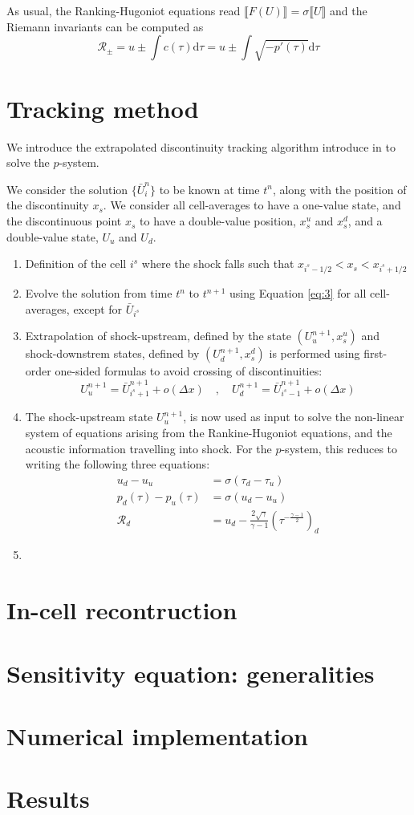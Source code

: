 \documentclass[10pt]{article}
\begin{document}
As usual, the Ranking-Hugoniot equations read $\llbracket F(U) \rrbracket = \sigma \llbracket U \rrbracket$
and the Riemann invariants can be computed as 
$$ \mathcal{R}_\pm = u \pm \int c(\tau) \text{d}\tau = u \pm \int \sqrt{-p'(\tau)}\text{d}\tau $$

\section{Tracking method}

We introduce the extrapolated discontinuity tracking algorithm introduce in \cite{} 
to solve the $p$-system.  

We consider the solution $\{\bar U^n_i\}$ to be known at time $t^n$, along with the position of the 
discontinuity $x_s$. We consider all cell-averages to have a one-value state, and the discontinuous point $x_s$
to have a double-value position, $x_s^u$ and $x_s^d$, and a double-value state, $U_u$ and $U_d$.  

\begin{enumerate}
\item Definition of the cell $i^s$ where the shock falls such that $x_{i^s-1/2}<x_s<x_{i^s+1/2}$ 
\item Evolve the solution from time $t^n$ to $t^{n+1}$ using Equation \eqref{eq:3} for all cell-averages, except for $\bar U_{i^s}$ 
\item Extrapolation of shock-upstream, defined by the state $(U^{n+1}_u, x_s^u)$ and shock-downstrem states, defined by $(U^{n+1}_d, x_s^d)$ 
is performed using first-order one-sided formulas to avoid crossing of discontinuities:
$$  U^{n+1}_u = \bar U^{n+1}_{i^s+1} + o(\Delta x) \quad , \quad U^{n+1}_d = \bar U^{n+1}_{i^s-1} + o(\Delta x) $$ 
\item The shock-upstream state $U^{n+1}_u$, is now used as input to solve the non-linear system of equations arising from the 
Rankine-Hugoniot equations, and the acoustic information travelling into shock. For the $p$-system, this reduces to writing  
the following three equations:
\begin{align*}
u_d - u_u &= \sigma (\tau_d - \tau_u) \\
p_d(\tau) - p_u(\tau) &= \sigma (u_d - u_u) \\
\mathcal{R}_d &= u_d - \frac{2\sqrt{\gamma}}{\gamma-1}(\tau^{-\frac{\gamma-1}{2}})_d 
\end{align*}
\item
\end{enumerate}

\section{In-cell recontruction}
 
\section{Sensitivity equation: generalities}

\section{Numerical implementation}

\section{Results}


 

 
\end{document}
